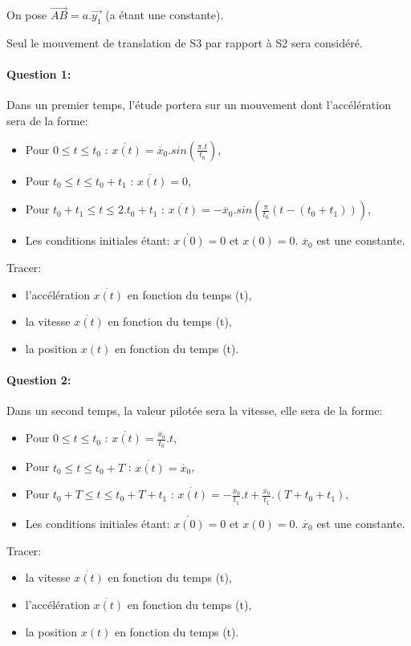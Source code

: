 On pose $\overrightarrow{AB}=a.\overrightarrow{y_1}$ (a étant une constante).


Seul le mouvement de translation de S3 par rapport à S2 sera considéré.

\newpage

\paragraph{Question 1:} Dans un premier temps, l'étude portera sur un mouvement dont l'accélération sera de la forme:

\begin{itemize}
 \item Pour $0 \le t \le t_0$ : $\ddot{x(t)}=\ddot{x_0}.sin(\frac{\pi.t}{t_0})$,
 \item Pour $t_0 \le t \le t_0+t_1$ : $\ddot{x(t)}=0$,
 \item Pour $t_0+t_1 \le t \le 2.t_0+t_1$ : $\ddot{x(t)}=-\ddot{x_0}.sin(\frac{\pi}{t_0}(t-(t_0+t_1)))$,
 \item Les conditions initiales étant: $\dot{x(0)}=0$ et $x(0)=0$. $\ddot{x_0}$ est une constante.
\end{itemize}

Tracer:
\begin{itemize}
 \item l'accélération $\ddot{x(t)}$ en fonction du temps (t),
 \item la vitesse $\dot{x(t)}$ en fonction du temps (t),
 \item la position $x(t)$ en fonction du temps (t).
\end{itemize}

\paragraph{Question 2:} Dans un second temps, la valeur pilotée sera la vitesse, elle sera de la forme:

\begin{itemize}
 \item Pour $0 \le t \le t_0$ : $\dot{x(t)}=\frac{\dot{x_0}}{t_0}.t$,
 \item Pour $t_0 \le t \le t_0+T$ : $\dot{x(t)}=\dot{x_0}$,
 \item Pour $t_0+T \le t \le t_0+T+t_1$ : $\dot{x(t)}=-\frac{\dot{x_0}}{t_1}.t+\frac{\dot{x_0}}{t_1}.(T+t_0+t_1)$,
 \item Les conditions initiales étant: $\dot{x(0)}=0$ et $x(0)=0$.  $\dot{x_0}$ est une constante.
\end{itemize}

Tracer:
\begin{itemize}
 \item la vitesse $\dot{x(t)}$ en fonction du temps (t),
 \item l'accélération $\ddot{x(t)}$ en fonction du temps (t),
 \item la position $x(t)$ en fonction du temps (t).
\end{itemize}


